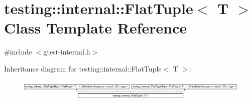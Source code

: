 \hypertarget{classtesting_1_1internal_1_1_flat_tuple}{}\section{testing\+::internal\+::Flat\+Tuple$<$ T $>$ Class Template Reference}
\label{classtesting_1_1internal_1_1_flat_tuple}


{\ttfamily \#include $<$gtest-\/internal.\+h$>$}

Inheritance diagram for testing\+::internal\+::Flat\+Tuple$<$ T $>$\+:\begin{figure}[H]
\begin{center}
\leavevmode
\includegraphics[height=1.029412cm]{d8/d7b/classtesting_1_1internal_1_1_flat_tuple}
\end{center}
\end{figure}
